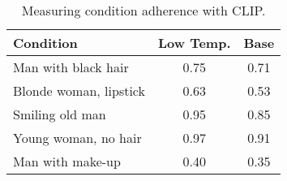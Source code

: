 \begin{table}[hb]
  \caption{Measuring condition adherence with CLIP.}
  \label{tab:clip_celeba}
  \centering
\begin{tabular}{lcc}
\toprule
\textbf{Condition} & \textbf{Low Temp.} &  \textbf{Base} \\ \hline
{Man with black hair}         & 0.75            & 0.71          \\
{Blonde woman, lipstick}   & 0.63            & 0.53         \\
{Smiling old man}       & 0.95              & 0.85               \\
{Young woman, no hair}  & 0.97       & 0.91   \\
{Man with make-up} & 0.40       & 0.35   \\
\bottomrule
\end{tabular}
\end{table}